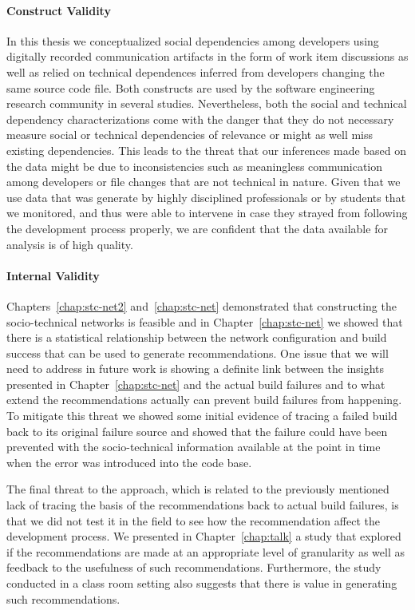\paragraph{Construct Validity}
In this thesis we conceptualized social dependencies among developers using digitally recorded communication artifacts in the form of work item discussions as well as relied on technical dependences inferred from developers changing the same source code file.
Both constructs are used by the software engineering research community in several studies.
Nevertheless, both the social and technical dependency characterizations come with the danger that they do not necessary measure social or technical dependencies of relevance or might as well miss existing dependencies.
This leads to the threat that our inferences made based on the data might be due to inconsistencies such as meaningless communication among developers or file changes that are not technical in nature.
Given that we use data that was generate by highly disciplined professionals or by students that we monitored, and thus were able to intervene in case they strayed from following the development process properly, we are confident that the data available for analysis is of high quality.

\paragraph{Internal Validity}
Chapters~\ref{chap:stc-net2} and~\ref{chap:stc-net} demonstrated that constructing the socio-technical networks is feasible and in Chapter~\ref{chap:stc-net} we showed that there is a statistical relationship between the network configuration and build success that can be used to generate recommendations.
One issue that we will need to address in future work is showing a definite link between the insights presented in Chapter~\ref{chap:stc-net} and the actual build failures and to what extend the recommendations actually can prevent build failures from happening.
To mitigate this threat we showed some initial evidence of tracing a failed build back to its original failure source and showed that the failure could have been prevented with the socio-technical information available at the point in time when the error was introduced into the code base.

The final threat to the approach, which is related to the previously mentioned lack of tracing the basis of the recommendations back to actual build failures, is that we did not test it in the field to see how the recommendation affect the development process.
We presented in Chapter~\ref{chap:talk} a study that explored if the recommendations are made at an appropriate level of granularity as well as feedback to the usefulness of such recommendations.
Furthermore, the study conducted in a class room setting also suggests that there is value in generating such recommendations.





